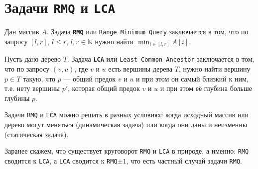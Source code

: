 \section{Задачи \texttt{RMQ} и \texttt{LCA}}

\begin{defn}
Дан массив $A$. Задача \texttt{\textbf{RMQ}} или \texttt{Range Minimum Query} заключается в том, что по запросу $[l, r]$, $l \leq r$, $l, r \in \mathbb{N}$ нужно найти $\min_{i \in [l, r]}{A[i]}$.
\end{defn}
\begin{defn}
Пусть дано дерево $T$. Задача \texttt{\textbf{LCA}} или \texttt{Least Common Ancestor} заключается в том, что по запросу $(v, u)$, где $v$ и $u$ есть вершины дерева $T$, нужно найти вершину $p \in T$ такую, что $p$ --- общий предок $v$ и $u$ и при этом он самый близкий к ним, т.е. нету вершины $p'$, которая общий предок $v$ и $u$ и при этом её глубина больше глубины $p$.  
\end{defn}
Задачи \texttt{RMQ} и \texttt{LCA} можно решать в разных условиях: когда исходный массив или дерево могут меняться (динамическая задача) или когда они даны и неизменны (статическая задача).
\begin{note}
Заранее скажем, что существует круговорот \texttt{RMQ} и \texttt{LCA} в природе, а именно: \texttt{RMQ} сводится к \texttt{LCA}, а \texttt{LCA} сводится к \texttt{RMQ$\pm 1$}, что есть частный случай задачи \texttt{RMQ}.
\end{note}

